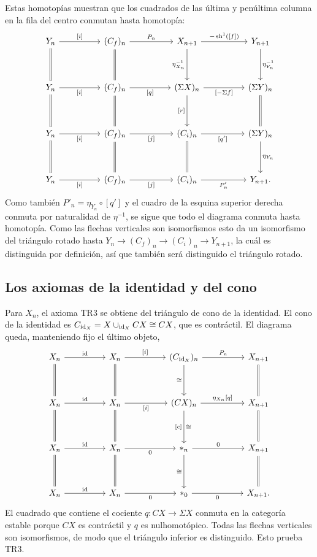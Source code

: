 Estas homotopías muestran que los cuadrados de las última y penúltima columna en la fila del centro conmutan hasta homotopía:
\[
\begin{tikzcd}[sep=huge]
Y_n \arrow[r,"{[i]}"] \arrow[d,equal] & (C_f)_n \arrow[r,"P_n"] \arrow[d,equal] & X_{n+1} \arrow[r,"{-\sh^1([f])}"] \arrow[d,"\eta_{X_n}^{-1}"'] & Y_{n+1} \arrow[d,"\eta_{Y_n}^{-1}"]\\
Y_n \arrow[r,"{[i]}"'] \arrow[d,equal] & (C_f)_n \arrow[r,"{[q]}"'] \arrow[d,equal] & (\Sigma X)_n \arrow[r,"{[-\Sigma f]}"'] \arrow[d,"{[r]}"'] & (\Sigma Y)_n \arrow[d,equal]\\
Y_n \arrow[r,"{[i]}"'] \arrow[d,equal] & (C_f)_n \arrow[r,"{[j]}"'] \arrow[d,equal] & (C_i)_n \arrow[r,"{[q']}"'] \arrow[d,equal] & (\Sigma Y)_n \arrow[d,"\eta_{Y_n}"]\\
Y_n \arrow[r,"{[i]}"'] & (C_f)_n \arrow[r,"{[j]}"'] & (C_i)_n \arrow[r,"P'_n"'] & Y_{n+1}.
\end{tikzcd}
\]
Como también $P'_n=\eta_{Y_n}\circ[q']$ y el cuadro de la esquina superior derecha conmuta por naturalidad de $\eta^{-1}$, se sigue que todo el diagrama conmuta hasta homotopía. Como las flechas verticales son isomorfismos esto da un isomorfismo del triángulo rotado hasta $Y_n \to (C_f)_n \to (C_i)_n \to Y_{n+1}$, la cuál es distinguida por definición, así que también será distinguido el triángulo rotado.


\subsection{Los axiomas de la identidad y del cono}
Para $X_n$, el axioma \textup{TR3} se obtiene del triángulo de cono de la identidad. El cono de la identidad es $C_{\operatorname{id}_X}=X\cup_{\operatorname{id}_X}CX\cong CX$, que es contráctil. El diagrama queda, manteniendo fijo el último objeto,
\[
\begin{tikzcd}[sep=huge]
X_n \arrow[r,"\id"] \arrow[d,equal] & X_n \arrow[r,"{[i]}"] \arrow[d,equal] & (C_{\id_X})_n \arrow[r,"P_n"] \arrow[d,"\cong"'] & X_{n+1} \arrow[d,equal]\\
X_n \arrow[r,"\id"] \arrow[d,equal] & X_n \arrow[r,"{[i]}"'] \arrow[d,equal] & (CX)_n \arrow[r,"{\eta_{X_n}[q]}"] \arrow[d,"{[c]}"',"\cong"] & X_{n+1} \arrow[d,equal]\\
X_n \arrow[r,"\id"] \arrow[d,equal] & X_n \arrow[r,"0"'] \arrow[d,equal] & *_n \arrow[r,"0"] \arrow[d,"\cong"'] & X_{n+1} \arrow[d,equal]\\
X_n \arrow[r,"\id"] & X_n \arrow[r,"0"'] & *_0 \arrow[r,"0"'] & X_{n+1}.
\end{tikzcd}
\]
El cuadrado que contiene el cociente $q\colon CX\to\Sigma X$ conmuta en la categoría estable porque $CX$ es contráctil y $q$ es nulhomotópico. Todas las flechas verticales son isomorfismos, de modo que el triángulo inferior es distinguido. Esto prueba \textup{TR3}.

